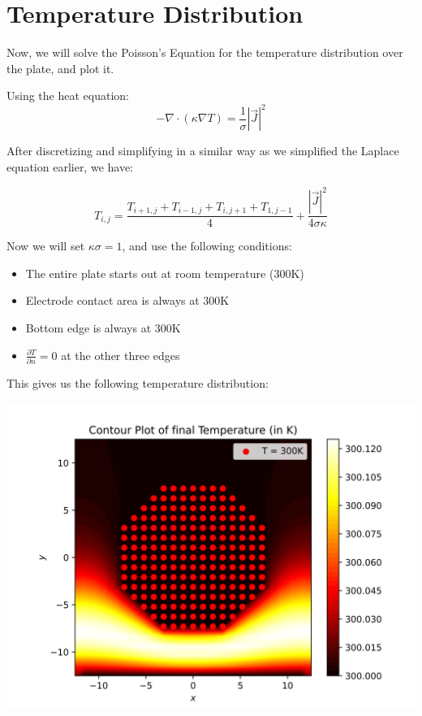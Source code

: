 \documentclass[12pt]{article}
\begin{document}
\section{Temperature Distribution}
Now, we will solve the Poisson's Equation for the temperature distribution over the plate, and plot it.

Using the heat equation:
$$-\nabla \cdot (\kappa \nabla T) = \frac{1}{\sigma} |\vec{J}|^2$$

After discretizing and simplifying in a similar way as we simplified the Laplace equation earlier, we have:

$$T_{i,j} = \frac{T_{i+1,j}+T_{i-1,j}+T_{i,j+1}+T_{1,j-1}}{4} + \frac{|\vec{J}|^2}{4\sigma \kappa}$$

Now we will set $\kappa \sigma = 1$, and use the following conditions:

\begin{itemize}
    \item The entire plate starts out at room temperature (300K)
    \item Electrode contact area is always at 300K
    \item Bottom edge is always at 300K
    \item $\frac{\partial T}{\partial n} = 0$ at the other three edges
\end{itemize}

This gives us the following temperature distribution:

\begin{center}
    \includegraphics{images/fig7.png}
\end{center}
\end{document}
